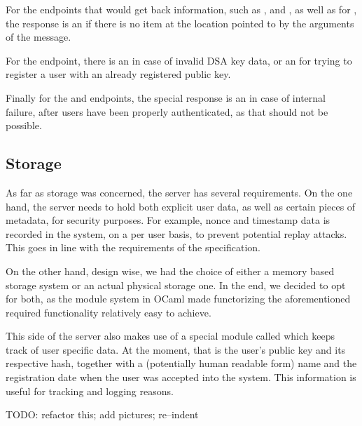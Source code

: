 For the endpoints that would get back information, such as ,  and , as well as for , the response is an  if there is no item at the location pointed to by the arguments of the message.

For the  endpoint, there is an  in case of invalid DSA key data, or an  for trying to register a user with an already registered public key.

Finally for the  and  endpoints, the special response is an  in case of internal failure, after users have been properly authenticated, as that should not be possible.

\subsection{Storage}
As far as storage was concerned, the server has several requirements.
On the one hand, the server needs to hold both explicit user data, as well as certain pieces of metadata, for security purposes.
For example, nonce and timestamp data is recorded in the system, on a per user basis, to prevent potential replay attacks.
This goes in line with the requirements of the specification.

On the other hand, design wise, we had the choice of either a memory based storage system or an actual physical storage one.
In the end, we decided to opt for both, as the module system in OCaml made functorizing the aforementioned required functionality relatively easy to achieve.

This side of the server also makes use of a special module called  which keeps track of user specific data.
At the moment, that is the user's public key and its respective hash, together with a (potentially human readable form) name and the registration date when the user was accepted into the system.
This information is useful for tracking and logging reasons.

TODO: refactor this; add pictures; re--indent

